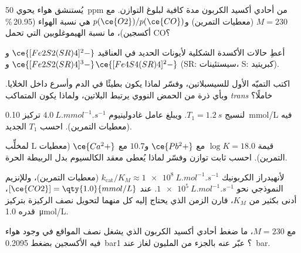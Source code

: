 \begin{exercise}[$\star\star$]\label{exo:b3:bioinorganic:6}
يُستنشق هواء يحوي \qty{50}{ppm} من أحادي أكسيد الكربون مدة كافية لبلوغ
التوازن. مع $M = 230$ (معطيات التمرين) و$p(\ce{O2})/p(\ce{CO})$ هي نسبة الهواء
(20.95\,\% أكسجين)، ما نسبة الهيموغلوبين التي تحمل CO؟
\end{exercise}

\begin{exercise}[$\star\star$]\label{exo:b3:bioinorganic:7}
أعطِ حالات الأكسدة الشكلية لأيونات الحديد في العناقيد $\ce{[Fe2S2(SR)4]^2-}$
و$\ce{[Fe2S2(SR)4]^3-}$ و$\ce{[Fe4S4(SR)4]^2-}$ (SR: سيستئينات، S: كبريتيد).
\end{exercise}

\begin{exercise}[$\star\star$]\label{exo:b3:bioinorganic:8}
اكتب التميّه الأول للسيسبلاتين، وفسّر لماذا يكون بطيئًا في الدم 
وأسرع داخل الخلايا. وبأي ذرة من الحمض النووي يرتبط البلاتين، ولماذا يكون
المتماكب \textit{trans} خاملًا؟
\end{exercise}

\begin{exercise}[$\star\star$]\label{exo:b3:bioinorganic:9}
لنسيج $T_1 = \qty{1.2}{s}$. ويبلغ عامل غادولينيوم  $\qty{4.0}{L.mmol^{-1}.s^{-1}}$ تركيز \qty{0.10}{mmol/L}
فيه (معطيات التمرين). احسب $T_1$ الجديد.
\end{exercise}

\begin{exercise}[$\star\star\star$]\label{exo:b3:bioinorganic:10}
لمخلِّب L قيمة $\log K = 18.0$ مع $\ce{Pb^2+}$ و$10.7$ مع $\ce{Ca^2+}$ (معطيات التمرين).
احسب ثابت توازن  وفسّر لماذا يُعطى معقد
الكالسيوم بدل الربيطة الحرة.
\end{exercise}

\begin{exercise}[$\star\star\star$]\label{exo:b3:bioinorganic:11}
لأنهيدراز الكربونيك $k_{\mathrm{cat}}/K_M \approx \qty{1e8}{L.mol^{-1}.s^{-1}}$ (معطيات التمرين)، وللإنزيم النموذجي نحو
$\qty{1e5}{L.mol^{-1}.s^{-1}}$. عند $[\ce{CO2}] = \qty{1.0}{mmol/L}$، أدنى بكثير من $K_M$، قارن الزمن الذي يحتاج إليه كل منهما لتحويل نصف
الركيزة بتركيز  قدره \qty{1.0}{\micro mol/L}.
\end{exercise}

\begin{exercise}[$\star\star\star$]\label{exo:b3:bioinorganic:12}
مع $M = 230$، ما ضغط أحادي أكسيد الكربون الذي يشغل نصف المواقع في
وجود هواء فيه الأكسجين بضغط \qty{0.2095}{bar}؟ عبّر عنه بالجزء من المليون لغاز عند \qty{1}{bar}.
\end{exercise}

